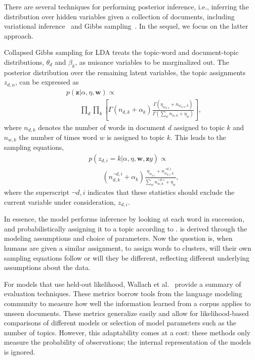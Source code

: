 There are several techniques for performing posterior inference,
i.e., inferring the distribution over hidden variables given a
collection of documents, including variational
inference~\cite{blei-03} and Gibbs sampling~\cite{griffiths-06}.  In
the sequel, we focus on the latter approach.  

Collapsed Gibbs sampling for LDA treats the topic-word and
document-topic distributions, $\theta_d$ and $\beta_k$, as nuisance
variables to be marginalized out. The posterior distribution over the
remaining latent variables, the topic assignments $z_{d,n}$, can be
expressed as
\begin{eqnarray*}
  &&p(\bm{z} | \alpha, \eta, \bm{w}) \propto \\
  &&\qquad \prod_{d}\prod_{k} \left[ \Gamma(n_{d,k} + \alpha_{k})\frac{\Gamma(\eta_{w_{d,n}} + n_{w_{d,n}, k})}{\Gamma(\sum_w n_{w, k} + \eta_w)}\right],
\end{eqnarray*}
where $n_{d,k}$ denotes the number of words in document $d$ assigned
to topic $k$ and $n_{w,k}$ the number of times word $w$ is assigned to
topic $k$.  This leads to the sampling equations,
\begin{eqnarray}
  &&p(z_{d,i} = k | \alpha, \eta, \bm{w}, \bm{z}y) \propto \\
  &&\qquad (n^{\lnot d,i}_{d,k} + \alpha_{k})\frac{\eta_{w_{d,i}} + n^{\lnot d,i}_{w_{d,i}, k}}{\sum_w n^{\lnot d,i}_{w, k} + \eta_w},
  \label{eq:sampling}
\end{eqnarray}
where the superscript $\lnot d,i$ indicates that these statistics
should exclude the current variable under consideration, $z_{d,i}$.

In essence, the model performs inference by looking at each word in
succession, and probabilistically assigning it to a topic according to
.   is derived through the
modeling assumptions and choice of parameters.  Now the question is,
when humans are given a similar assignment, to assign words to
clusters, will their own sampling equations follow 
or will they be different, reflecting different underlying assumptions
about the data.

For models that use held-out likelihood, Wallach et
al.~\cite{wallach-09} provide a summary of evaluation
techniques. These metrics borrow tools from the language modeling
community to measure how well the information learned from a corpus
applies to unseen documents.  These metrics generalize easily and
allow for likelihood-based comparisons of different models or
selection of model parameters such as the number of topics.  However,
this adaptability comes at a cost: these methods only measure the
probability of observations; the internal representation of the models
is ignored.

